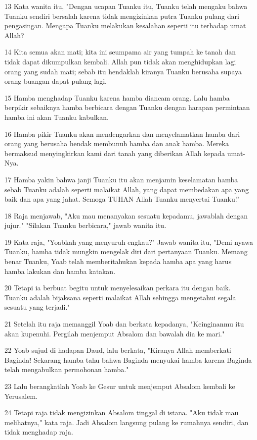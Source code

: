\par 13 Kata wanita itu, "Dengan ucapan Tuanku itu, Tuanku telah mengaku bahwa Tuanku sendiri bersalah karena tidak mengizinkan putra Tuanku pulang dari pengasingan. Mengapa Tuanku melakukan kesalahan seperti itu terhadap umat Allah?
\par 14 Kita semua akan mati; kita ini seumpama air yang tumpah ke tanah dan tidak dapat dikumpulkan kembali. Allah pun tidak akan menghidupkan lagi orang yang sudah mati; sebab itu hendaklah kiranya Tuanku berusaha supaya orang buangan dapat pulang lagi.
\par 15 Hamba menghadap Tuanku karena hamba diancam orang. Lalu hamba berpikir sebaiknya hamba berbicara dengan Tuanku dengan harapan permintaan hamba ini akan Tuanku kabulkan.
\par 16 Hamba pikir Tuanku akan mendengarkan dan menyelamatkan hamba dari orang yang berusaha hendak membunuh hamba dan anak hamba. Mereka bermaksud menyingkirkan kami dari tanah yang diberikan Allah kepada umat-Nya.
\par 17 Hamba yakin bahwa janji Tuanku itu akan menjamin keselamatan hamba sebab Tuanku adalah seperti malaikat Allah, yang dapat membedakan apa yang baik dan apa yang jahat. Semoga TUHAN Allah Tuanku menyertai Tuanku!"
\par 18 Raja menjawab, "Aku mau menanyakan sesuatu kepadamu, jawablah dengan jujur." "Silakan Tuanku berbicara," jawab wanita itu.
\par 19 Kata raja, "Yoabkah yang menyuruh engkau?" Jawab wanita itu, "Demi nyawa Tuanku, hamba tidak mungkin mengelak diri dari pertanyaan Tuanku. Memang benar Tuanku, Yoab telah memberitahukan kepada hamba apa yang harus hamba lakukan dan hamba katakan.
\par 20 Tetapi ia berbuat begitu untuk menyelesaikan perkara itu dengan baik. Tuanku adalah bijaksana seperti malaikat Allah sehingga mengetahui segala sesuatu yang terjadi."
\par 21 Setelah itu raja memanggil Yoab dan berkata kepadanya, "Keinginanmu itu akan kupenuhi. Pergilah menjemput Absalom dan bawalah dia ke mari."
\par 22 Yoab sujud di hadapan Daud, lalu berkata, "Kiranya Allah memberkati Baginda! Sekarang hamba tahu bahwa Baginda menyukai hamba karena Baginda telah mengabulkan permohonan hamba."
\par 23 Lalu berangkatlah Yoab ke Gesur untuk menjemput Absalom kembali ke Yerusalem.
\par 24 Tetapi raja tidak mengizinkan Absalom tinggal di istana. "Aku tidak mau melihatnya," kata raja. Jadi Absalom langsung pulang ke rumahnya sendiri, dan tidak menghadap raja.

